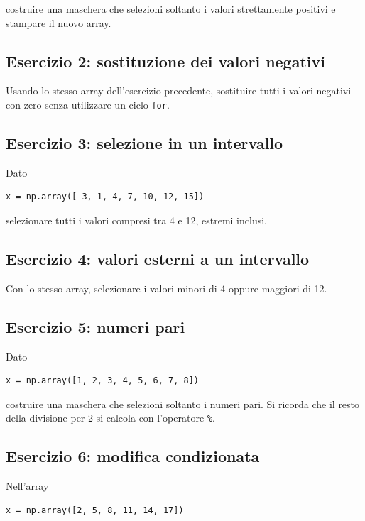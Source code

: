 \documentclass[11pt,a4paper]{book}
\begin{document}
costruire una maschera che selezioni soltanto i valori strettamente positivi e stampare il nuovo array.

\subsection*{Esercizio 2: sostituzione dei valori negativi}

Usando lo stesso array dell'esercizio precedente, sostituire tutti i valori negativi con zero senza utilizzare un ciclo \texttt{for}.

\subsection*{Esercizio 3: selezione in un intervallo}

Dato

\begin{lstlisting}
x = np.array([-3, 1, 4, 7, 10, 12, 15])
\end{lstlisting}

selezionare tutti i valori compresi tra 4 e 12, estremi inclusi.

\subsection*{Esercizio 4: valori esterni a un intervallo}

Con lo stesso array, selezionare i valori minori di 4 oppure maggiori di 12.

\subsection*{Esercizio 5: numeri pari}

Dato

\begin{lstlisting}
x = np.array([1, 2, 3, 4, 5, 6, 7, 8])
\end{lstlisting}

costruire una maschera che selezioni soltanto i numeri pari. Si ricorda che il resto della divisione per 2 si calcola con l'operatore \texttt{\%}.

\subsection*{Esercizio 6: modifica condizionata}

Nell'array

\begin{lstlisting}
x = np.array([2, 5, 8, 11, 14, 17])
\end{lstlisting}
\end{document}
